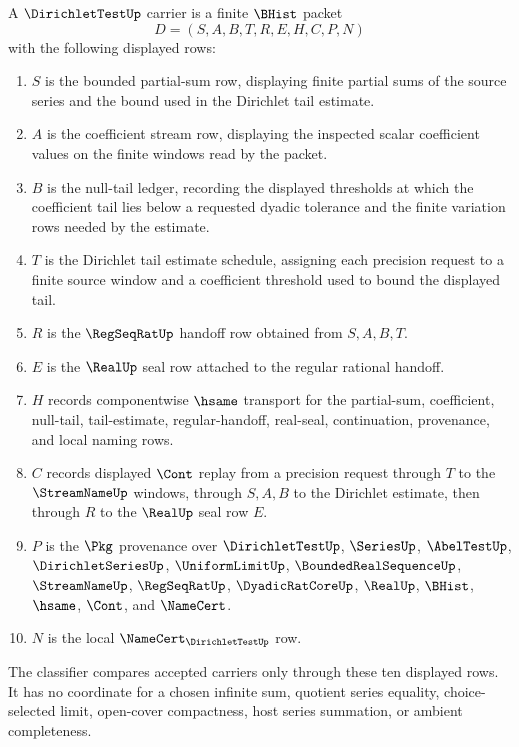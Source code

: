 \begin{definition}
\label{def:dirichlet-test-carrier}
A $\DirichletTestUp$ carrier is a finite $\BHist$ packet
$$
D=(S,A,B,T,R,E,H,C,P,N)
$$
with the following displayed rows:
\begin{enumerate}
\item $S$ is the bounded partial-sum row, displaying finite partial sums of the source series and the bound used in the Dirichlet tail estimate.
\item $A$ is the coefficient stream row, displaying the inspected scalar coefficient values on the finite windows read by the packet.
\item $B$ is the null-tail ledger, recording the displayed thresholds at which the coefficient tail lies below a requested dyadic tolerance and the finite variation rows needed by the estimate.
\item $T$ is the Dirichlet tail estimate schedule, assigning each precision request to a finite source window and a coefficient threshold used to bound the displayed tail.
\item $R$ is the $\RegSeqRatUp$ handoff row obtained from $S,A,B,T$.
\item $E$ is the $\RealUp$ seal row attached to the regular rational handoff.
\item $H$ records componentwise $\hsame$ transport for the partial-sum, coefficient, null-tail, tail-estimate, regular-handoff, real-seal, continuation, provenance, and local naming rows.
\item $C$ records displayed $\Cont$ replay from a precision request through $T$ to the $\StreamNameUp$ windows, through $S,A,B$ to the Dirichlet estimate, then through $R$ to the $\RealUp$ seal row $E$.
\item $P$ is the $\Pkg$ provenance over $\DirichletTestUp$, $\SeriesUp$, $\AbelTestUp$, $\DirichletSeriesUp$, $\UniformLimitUp$, $\BoundedRealSequenceUp$, $\StreamNameUp$, $\RegSeqRatUp$, $\DyadicRatCoreUp$, $\RealUp$, $\BHist$, $\hsame$, $\Cont$, and $\NameCert$.
\item $N$ is the local $\NameCert_{\DirichletTestUp}$ row.
\end{enumerate}
The classifier compares accepted carriers only through these ten displayed rows. It has no coordinate for a chosen infinite sum, quotient series equality, choice-selected limit, open-cover compactness, host series summation, or ambient completeness.
\end{definition}

